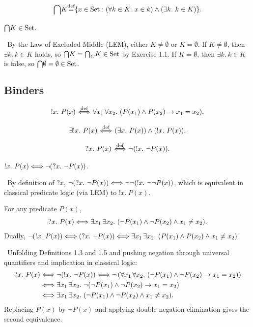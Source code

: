 \documentclass[10pt,a4paper]{article}
\begin{document}
\begin{definition}
$${\bigcap} K {\stackrel{{\textrm{def}}}{=}} \{x \in {\textrm{Set}} : (\forall k\in K.\ x\in k)\land (\exists k.\ k\in K)\}.$$
\end{definition}

\begin{exercise}
${\bigcap} K \in {\textrm{Set}}$.
\end{exercise}
\myprf\ By the Law of Excluded Middle (LEM), either $K \neq \emptyset$ or $K = \emptyset$. If $K \neq \emptyset$, then $\exists k.\ k \in K$ holds, so ${\bigcap} K = {{\bigcap}_C} K \in {\textrm{Set}}$ by Exercise 1.1. If $K = \emptyset$, then $\exists k.\ k \in K$ is false, so ${\bigcap} \emptyset = \emptyset \in {\textrm{Set}}$. \myqed

\subsection{Binders}
\begin{definition}
$$!x.\ P(x) {\stackrel{{\textrm{def}}}{\ \Longleftrightarrow\ }} \forall x_1\, \forall x_2.\ (P(x_1)\land P(x_2)\to x_1=x_2).$$
\end{definition}

\begin{definition}
$$\exists !x.\ P(x) \propdef (\exists x.\ P(x))\land(!x.\ P(x)).$$
\end{definition}

\begin{definition}
$$?x.\ P(x) {\stackrel{{\textrm{def}}}{\ \Longleftrightarrow\ }} \neg (!x.\ \neg P(x)).$$
\end{definition}

\begin{exercise}
$!x.\ P(x) \Longleftrightarrow \neg (?x.\ \neg P(x))$.
\end{exercise}
\myprf\ By definition of $?x$, $\neg (?x.\ \neg P(x)) \LRA \neg \neg (!x.\ \neg \neg P(x))$, which is equivalent in classical predicate logic (via LEM) to $!x.\ P(x)$. \myqed

\begin{lemma}
For any predicate $P(x)$,
$$?x.\ P(x) \LRA \exists x_1\, \exists x_2.\ (\neg P(x_1) \land \neg P(x_2) \land x_1 \neq x_2).$$
Dually, $\neg (!x.\ P(x)) \Longleftrightarrow (?x.\ \neg P(x)) \Longleftrightarrow \exists x_1\, \exists x_2.\ (P(x_1) \land P(x_2) \land x_1 \neq x_2)$.
\end{lemma}
\myprf\ Unfolding Definitions 1.3 and 1.5 and pushing negation through universal quantifiers and implication in classical logic:
\begin{align*}
?x.\ P(x) &\Longleftrightarrow \neg (!x.\ \neg P(x)) \Longleftrightarrow \neg \left(\forall x_1\, \forall x_2.\ (\neg P(x_1) \land \neg P(x_2) \to x_1 = x_2)\right) \\
&\Longleftrightarrow \exists x_1\, \exists x_2.\ \neg (\neg P(x_1) \land \neg P(x_2) \to x_1 = x_2) \\
&\Longleftrightarrow \exists x_1\, \exists x_2.\ (\neg P(x_1) \land \neg P(x_2) \land x_1 \neq x_2).
\end{align*}
Replacing $P(x)$ by $\neg P(x)$ and applying double negation elimination gives the second equivalence. \myqed
\end{document}
